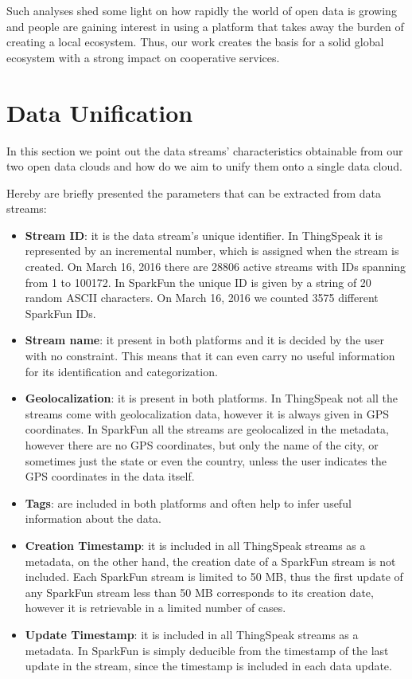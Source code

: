 \documentclass[conference]{IEEEtran}
\begin{document}
Such analyses shed some light on how rapidly the world of open data is growing and people are gaining interest in using a platform that takes away the burden of creating a local ecosystem.
Thus, our work creates the basis for a solid global ecosystem with a strong impact on cooperative services.


\section{Data Unification}
\label{unification}
In this section we point out the data streams' characteristics obtainable from our two open data clouds and how do we aim to unify them onto a single data cloud.

Hereby are briefly presented the parameters that can be extracted from data streams:
\begin{itemize}
 \item \textbf{Stream ID}: it is the data stream's unique identifier. In ThingSpeak it is represented by an incremental number, which is assigned when the stream is created. On March 16, 2016 there are 28806 active streams with IDs spanning from 1 to 100172. In SparkFun the unique ID is given by a string of 20 random ASCII characters. On March 16, 2016 we counted 3575 different SparkFun IDs. 
 \item \textbf{Stream name}: it present in both platforms and it is decided by the user with no constraint. This means that it can even carry no useful information for its identification and categorization.
 \item \textbf{Geolocalization}: it is present in both platforms. In ThingSpeak not all the streams come with geolocalization data, however it is always given in GPS coordinates. In SparkFun all the streams are geolocalized in the metadata, however there are no GPS coordinates, but only the name of the city, or sometimes just the state or even the country, unless the user indicates the GPS coordinates in the data itself.
 \item \textbf{Tags}: are included in both platforms and often help to infer useful information about the data.
 \item \textbf{Creation Timestamp}: it is included in all ThingSpeak streams as a metadata, on the other hand, the creation date of a SparkFun stream is not included. Each SparkFun stream is limited to 50 MB, thus the first update of any SparkFun stream less than 50 MB corresponds to its creation date,  however it is retrievable in a limited number of cases.
 \item \textbf{Update Timestamp}: it is included in all ThingSpeak streams as a metadata. In SparkFun is simply deducible from the timestamp of the last update in the stream, since the timestamp is included in each data update.

\end{itemize}
\end{document}
